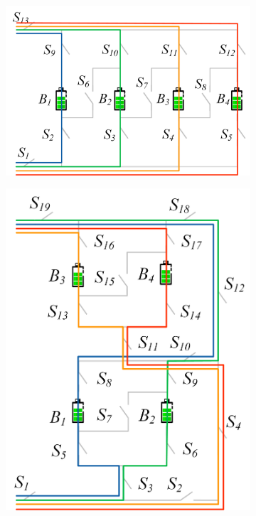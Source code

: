 \documentclass{article}
\providecommand{\DIFadd}[1]{{\protect\color{blue}\uwave{#1}}} %
\providecommand{\DIFaddFL}[1]{\DIFadd{#1}} %
\begin{document}
\begin{figure}[htbp]
\begin{subfigure}[b]{0.2\textwidth}
        \caption{}
        \label{fig:e4-sp}
    \end{subfigure}
    \DIFaddFL{\hspace{0.02\textwidth}
    }\begin{subfigure}[b]{0.4\textwidth}
        \includegraphics[width=\textwidth]{f4-sp.png}
        \caption{}
        \label{fig:f4-sp}
    \end{subfigure}
    \DIFaddFL{\hspace{0.02\textwidth}
    }\begin{subfigure}[b]{0.31\textwidth}
        \includegraphics[width=\textwidth]{e2f2-sp.png}

\end{subfigure}
\end{figure}
\end{document}
